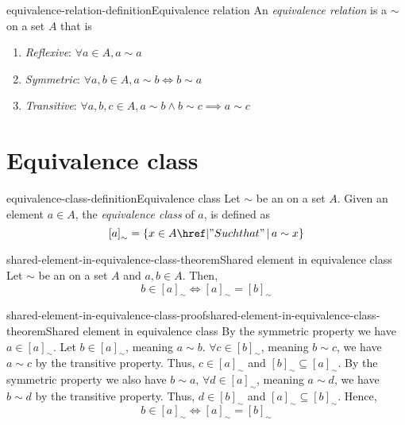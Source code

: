 \documentclass[preview]{standalone}
\begin{document}
\begin{snippetdefinition}{equivalence-relation-definition}{Equivalence relation}
    An \textit{equivalence relation} is a \homrelation \(\sim\) on a set \(A\)
    that is
    \begin{enumerate}
        \item \textit{Reflexive}: \(\forall a \in A, a \sim a\)
        \item \textit{Symmetric}: \(\forall a,b \in A, a \sim b \iff b \sim a\)
        \item \textit{Transitive}: \(\forall a,b,c \in A, a \sim b \land b \sim c \implies a \sim c\)
    \end{enumerate}
\end{snippetdefinition}

\section{Equivalence class}

\begin{snippetdefinition}{equivalence-class-definition}{Equivalence class}
    Let \(\sim\) be an \equivrelation on a set \(A\).
    Given an element \(a\in A\), the \textit{equivalence class} of \(a\), is defined as
    \[
        {[a]}_{\sim} = \{x \in A \suchthat a \sim x\}
    \]
\end{snippetdefinition}

\begin{snippettheorem}{shared-element-in-equivalence-class-theorem}{Shared element in equivalence class}
    Let \(\sim\) be an \equivrelation on a set \(A\)
    and \(a,b \in A\).
    Then,
    \[
        b \in {[a]}_{\sim} \iff {[a]}_{\sim} = {[b]}_{\sim}
    \]
\end{snippettheorem}

\begin{snippetproof}{shared-element-in-equivalence-class-proof}{shared-element-in-equivalence-class-theorem}{Shared element in equivalence class}
    By the symmetric property we have \(a \in {[a]}_{\sim}\).
    Let \(b \in {[a]}_{\sim}\), meaning \(a \sim b\). \(\forall c \in {[b]}_{\sim}\),
    meaning \(b \sim c\), we have \(a \sim c\) by the transitive property.
    Thus, \(c \in {[a]}_{\sim}\) and \({[b]}_{\sim} \subseteq {[a]}_{\sim}\).
    By the symmetric property we also have \(b \sim a\),
    \(\forall d \in {[a]}_{\sim}\), meaning \(a \sim d\), we have
    \(b \sim d\) by the transitive property. Thus, \(d \in {[b]}_{\sim}\)
    and \({[a]}_{\sim} \subseteq {[b]}_{\sim}\). Hence,
    \[
        b \in {[a]}_{\sim} \iff {[a]}_{\sim} = {[b]}_{\sim}
    \]
\end{snippetproof}
\end{document}
